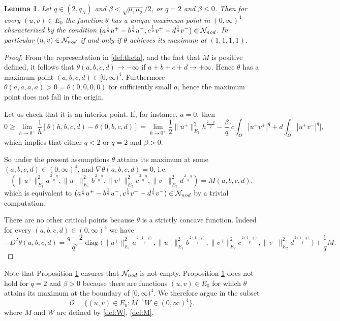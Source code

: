 \documentclass[10pt,a4paper]{amsart}
\numberwithin{equation}{section}
\newtheorem{lemma}[theo]{Lemma}
\begin{document}
\begin{lemma}\label{prop:theta_qnot2}
Let $q\in (2,q_N)$ and $\beta<\sqrt{\mu_1\mu_2}/2$, or $q=2$ and $\beta \le 0$.
Then for every $(u,v)\in  E_0$  the function
$\theta$ has a unique maximum point in $ (0,\infty)^4$ characterized by the condition
$(a^{\frac{1}q} u^+ -b^{\frac{1}q} u^-, c^{\frac{1}q} v^+ -d^{\frac{1}q} v^-)
 \in \mathcal N_{\rm nod}$.
In particular $(u,v)\in \mathcal N_{\rm nod}$ if and only if $\theta$ achieves its
maximum at $(1,1,1,1)$.
\end{lemma}

\begin{proof}
From the representation in \eqref{def:theta}, and the fact that $M$ is positive defined,
it follows that $\theta(a,b,c,d) \to -\infty$ if $a+b+c+d \to + \infty$. Hence $\theta$
has a maximum point $(a,b,c,d) \in [0,\infty)^4$.
Furthermore $\theta(a,a,a,a)>0=\theta(0,0,0,0)$ for sufficiently small $a$, hence the
maximum point does not fall in the origin.

Let us check that it is an interior point.
If, for instance, $a=0$, then
\[
0\ge \lim_{h\to 0^+} \frac{1}{h}\left[\theta(h, b,c,d) -  \theta(0, b,c,d)\right]
= \lim_{h\to 0^+} \frac{1}{2} \|u^+\|_{E_1}^2 h^{\frac{2-q}q}
- \frac{\beta}{q} \Big[ c \int_{\Omega} |u^+v^+|^q + d \int_{\Omega} |u^+v^-|^q \Big] ,
\]
which implies that either $q <2$ or $q=2$ and $\beta >0$.

So under the present assumptions $\theta$ attains its maximum at some
$(a,b,c,d) \in (0,\infty)^4$, and $\nabla \theta (a,b,c,d)=0$, i.e.
\[
 \left( \|u^+\|_{E_1}^2 a^{\frac{2-q}{q}} , \|u^-\|_{E_1}^2 b^{\frac{2-q}{q}},
 \|v^+\|_{E_2}^2 c^{\frac{2-q}{q}}, \|v^-\|_{E_2}^2 d^{\frac{2-q}{q}}\right)
= M (a,b,c,d) ,
\]
which is equivalent to
$(a^{\frac{1}q} u^+ -b^{\frac{1}q} u^-, c^{\frac{1}q} v^+ -d^{\frac{1}q} v^-)
\in \mathcal N_{\rm nod}$ by a trivial computation.

There are no other  critical points   because $\theta$ is a strictly concave function.
Indeed for every $(a,b,c,d)\in (0,\infty)^4$ we have
\[
- D^2\theta(a,b,c,d) =\frac{q-2}{q^2}
\operatorname{diag}\Big( \|u^+\|_{E_1}^2 a^{\frac{2(1-q)}{q}} ,
\|u^-\|_{E_1}^2 b^{\frac{2(1-q)}{q}}, \|v^+\|_{E_2}^2 c^{\frac{2(1-q)}{q}},
\|v^-\|_{E_2}^2 d^{\frac{2(1-q)}{q}}\Big)
+ \frac{1}q M .
\]
\end{proof}

Note that Proposition \ref{prop:theta_qnot2}  ensures that
$\mathcal N_{\rm nod}$ is not empty.
Proposition \ref{prop:theta_qnot2} does not hold for $q=2$ and $\beta > 0$ because
there are functions $(u,v)\in E_{0}$ for which $\theta$ attains its maximum at the
boundary of $[0,\infty)^4$. We therefore argue in the subset
\begin{equation}\label{def:O}
 \mathcal O = \{ (u,v) \in E_0 :  M^{-1} W \in (0,\infty)^4\} .
\end{equation}
where $M$ and $W$ are defined by \eqref{def:W}, \eqref{def:M}.
\end{document}
